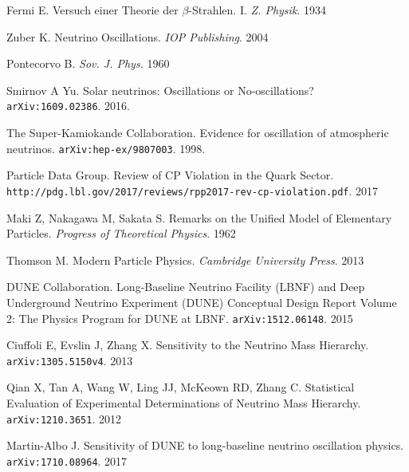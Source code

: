 \begin{thebibliography}{100}

 Fermi E. Versuch einer Theorie der $\beta$-Strahlen. I.
		\textit{Z. Physik}. 1934

 Zuber K. Neutrino
		Oscillations. \textit{IOP Publishing}. 2004

 Pontecorvo B. \textit{Sov. J. Phys.} 1960

 Smirnov A Yu. Solar neutrinos: Oscillations or
		No-oscillations? \texttt{arXiv:1609.02386}. 2016.

 The Super-Kamiokande Collaboration. Evidence for oscillation
		of atmospheric neutrinos. \texttt{arXiv:hep-ex/9807003}. 1998.

 Particle Data Group. Review of CP Violation in the Quark Sector.
		\texttt{http://pdg.lbl.gov/2017/reviews/rpp2017-rev-cp-violation.pdf}. 2017

 Maki Z, Nakagawa M, Sakata S. Remarks on the Unified Model of
		Elementary Particles. \textit{Progress of Theoretical Physics}. 1962

 Thomson M. Modern Particle Physics. \textit{Cambridge
		University Press}. 2013

 DUNE Collaboration. Long-Baseline Neutrino Facility (LBNF) and
		Deep Underground Neutrino Experiment (DUNE) Conceptual Design Report Volume
		2: The Physics Program for DUNE at LBNF. \texttt{arXiv:1512.06148}. 2015

 Ciuffoli E, Evslin J, Zhang X. Sensitivity to the
		Neutrino Mass Hierarchy. \texttt{arXiv:1305.5150v4}. 2013

 Qian X, Tan A, Wang W, Ling JJ, McKeown RD, Zhang C.
		Statistical Evaluation of Experimental Determinations of Neutrino Mass
		Hierarchy. \texttt{arXiv:1210.3651}. 2012

 Martin-Albo J. Sensitivity of DUNE to long-baseline
		neutrino oscillation physics. \texttt{arXiv:1710.08964}. 2017


\end{thebibliography}

\newpage{\pagestyle{empty}\cleardoublepage}